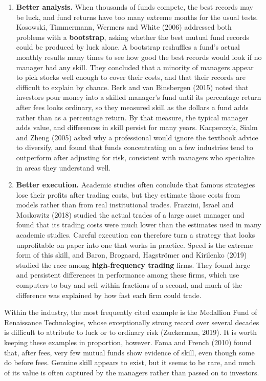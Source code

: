 \begin{itemize}
\begin{enumerate}
    \item \textbf{Better analysis.} When thousands of funds compete, the best
  records may be luck, and fund returns have too many extreme months for the
  usual tests. Kosowski, Timmermann, Wermers and White (2006) addressed both
  problems with a \textbf{bootstrap}, asking whether the best mutual
  fund records could be produced by luck alone. A bootstrap reshuffles a fund's actual monthly
  results many times to see how good the best records would look if no
  manager had any skill. They concluded that a minority of managers appear
  to pick stocks well enough to cover their costs, and that their records are
  difficult to explain by chance. Berk and van Binsbergen (2015) noted that
  investors pour money into a skilled manager's fund until its percentage
  return after fees looks ordinary, so they measured skill as the dollars a
  fund adds rather than as a percentage return. By
  that measure, the typical manager adds value, and differences in skill
  persist for many years. Kacperczyk, Sialm and Zheng (2005) asked why a
  professional would ignore the textbook advice to diversify, and found that
  funds concentrating on a few industries tend to outperform after adjusting for
  risk, consistent with managers who specialize in areas they understand well.

    \item \textbf{Better execution.} Academic studies often conclude that
  famous strategies lose their profits after trading costs, but they estimate
  those costs from models rather than from real institutional trades.
  Frazzini, Israel and Moskowitz (2018) studied the actual trades of a large
  asset manager and found that its trading costs were much lower than the
  estimates used in many academic studies. Careful
  execution can therefore turn a strategy that looks unprofitable on paper
  into one that works in practice. Speed is the extreme form of this
  skill, and Baron, Brogaard, Hagstr\"om{}er and Kirilenko (2019) studied the
  race among \textbf{high-frequency trading} firms. They found large and persistent
  differences in performance among these firms, which use computers to buy and sell
  within fractions of a second, and much of the difference was
  explained by how fast each firm could trade.
  
  \end{enumerate}

  Within the industry, the most frequently cited example is the Medallion
  Fund of Renaissance Technologies, whose exceptionally strong record over
  several decades is difficult to attribute to luck or to ordinary risk
  (Zuckerman, 2019). It is worth keeping these examples in proportion,
  however. Fama and French (2010) found that, after fees, very few mutual
  funds show evidence of skill, even though some do before fees. Genuine
  skill appears to exist, but it seems to be rare, and much of its value is
  often captured by the managers rather than passed on to investors.
  
  
\end{itemize}




